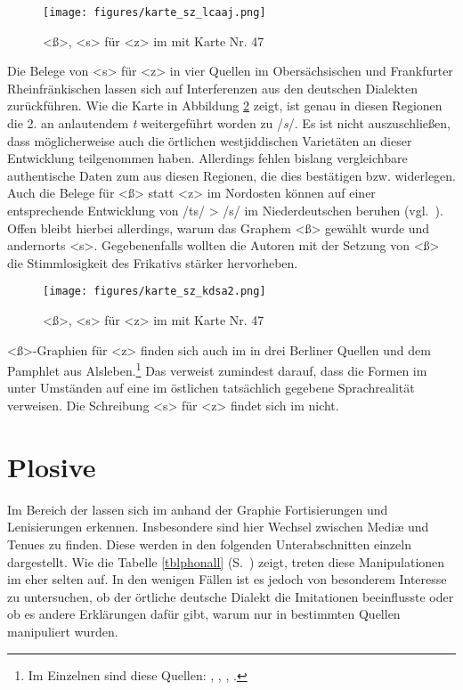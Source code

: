 { \begin{figure}[t]
\texttt{[image: figures/karte\_sz\_lcaaj.png]}
		\caption{\label{karteszlcaaj} <ß>, <s> für <z> im  mit  Karte Nr. 47}
		\end{figure}


 
Die Belege von <s> für <z> in vier Quellen im Obersächsischen und Frankfurter Rheinfränkischen lassen sich auf Interferenzen aus den deutschen Dialekten zurückführen. 
Wie die Karte in Abbildung \ref{karteszkdsa} zeigt, ist genau in diesen Regionen die 2.  an anlautendem {\germ} \textit{t} weitergeführt worden zu /\textit{s}/. Es ist nicht auszuschließen, dass möglicherweise auch die örtlichen westjiddischen Varietäten an dieser Entwicklung teilgenommen haben. Allerdings fehlen bislang vergleichbare authentische Daten zum \hai{{\WJ}} aus diesen Regionen, die dies bestätigen bzw. widerlegen. Auch die Belege für <ß> statt <z> im Nordosten können auf einer entsprechende Entwicklung von /ts/ > /s/ im Niederdeutschen beruhen (vgl.\, \citealt[282]{Schirmunski1962}). Offen bleibt hierbei allerdings, warum das Graphem <ß> gewählt wurde und andernorts <s>. Gegebenenfalls wollten die Autoren mit der Setzung von <ß> die Stimmlosigkeit des Frikativs stärker hervorheben.


 \begin{figure}
		\centering
\texttt{[image: figures/karte\_sz\_kdsa2.png]}
		\caption{\label{karteszkdsa} <ß>, <s> für <z> im  mit  Karte Nr. 47}
		\end{figure}


  
<ß>-Graphien für <z> finden sich auch im  in drei Berliner Quellen und dem Pamphlet aus Alsleben.\footnote{Im Einzelnen sind diese Quellen: , , , .} Das verweist zumindest darauf, dass die Formen im  unter Umständen auf eine im östlichen  tatsächlich gegebene Sprachrealität verweisen. Die Schreibung <s> für <z> findet sich im  nicht.


  \section{Plosive}\label{plosivekap} 
  Im Bereich der  lassen sich im \hai{{\LiJi}} anhand der Graphie Fortisierungen und Lenisierungen erkennen. Insbesondere sind hier Wechsel zwischen Mediæ und Tenues zu finden. Diese werden in den folgenden Unterabschnitten einzeln dargestellt. Wie die Tabelle \ref{tblphonall} (S.\, \pageref{tblphonall}) zeigt, treten diese Manipulationen im \hai{{\LiJi}} eher selten auf. In den wenigen Fällen ist es jedoch von besonderem Interesse zu untersuchen, ob der örtliche deutsche Dialekt die Imitationen beeinflusste oder ob es andere Erklärungen dafür gibt, warum  nur in bestimmten Quellen manipuliert wurden.
  
}
